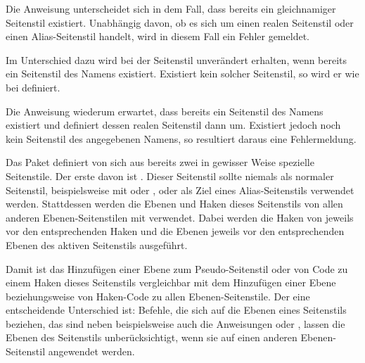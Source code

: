 Die Anweisung  unterscheidet sich in dem
Fall, dass bereits ein gleichnamiger Seitenstil existiert. Unabhängig davon,
ob es sich um einen realen Seitenstil oder einen Alias-Seitenstil handelt,
wird in diesem Fall ein Fehler gemeldet.%
\fi

Im Unterschied dazu wird bei  der Seitenstil
unverändert erhalten, wenn bereits ein Seitenstil des Namens
 existiert. Existiert kein solcher Seitenstil, so wird
er wie bei  definiert.

Die Anweisung  wiederum erwartet, dass
bereits ein Seitenstil des Namens  existiert und
definiert dessen realen Seitenstil dann um. Existiert jedoch noch kein
Seitenstil des angegebenen Namens, so resultiert daraus eine Fehlermeldung.%
\iffalse %
\par
Beachten Sie des Weiteren die nachfolgenden Anmerkungen zum Pseudo-Seitenstil
\PageStyle{@everystyle@}.%
\fi%
\EndIndexGroup


\begin{Declaration}
\end{Declaration}
%
%
Das Paket  definiert von sich aus bereits zwei in gewisser
Weise spezielle Seitenstile. Der erste davon ist
. Dieser
Seitenstil sollte niemals als normaler Seitenstil, beispielsweise mit
 oder , oder
als Ziel eines Alias-Seitenstils verwendet werden. Stattdessen werden die
Ebenen und Haken dieses Seitenstils von allen anderen
Ebenen-Seitenstilen mit verwendet. Dabei werden die Haken von
 jeweils vor den entsprechenden Haken und die Ebenen
jeweils vor den entsprechenden Ebenen des aktiven Seitenstils ausgeführt.

Damit ist das Hinzufügen einer Ebene zum Pseudo-Seitenstil
 oder von Code zu einem Haken dieses Seitenstils
vergleichbar mit dem Hinzufügen einer Ebene beziehungsweise von Haken-Code zu
allen Ebenen-Seitenstile. Der eine entscheidende Unterschied ist: Befehle, die
sich auf die Ebenen eines Seitenstils beziehen, das sind neben
 beispielsweise auch die
Anweisungen  oder
, lassen die Ebenen des
Seitenstils  unberücksichtigt, wenn sie auf einen
anderen Ebenen-Seitenstil angewendet werden.

